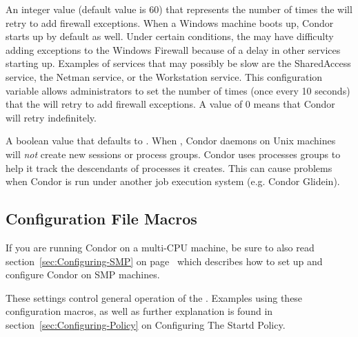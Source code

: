 \begin{description}
\label{param:WindowsFirewallFailureRetry} 
\item[\Macro{WINDOWS\_FIREWALL\_FAILURE\_RETRY}]
  An integer value (default value is 60) that represents
  the number of times the  will retry to add
  firewall exceptions.
  When a Windows machine boots
  up, Condor starts up by default as well. Under certain conditions, the
   may have difficulty adding exceptions to the Windows
  Firewall because of a delay in other services starting up.
  Examples of services that may possibly be slow are the 
  SharedAccess service, the Netman service, or the Workstation service.
  This configuration variable allows administrators to set the number of
  times (once every 10 seconds) that the  will retry
  to add firewall exceptions. A value of 0 means that Condor will
  retry indefinitely.

\label{param:UseProcessGroups} 
\item[\Macro{USE\_PROCESS\_GROUPS}]
  A boolean value that defaults to .  When ,
  Condor daemons on Unix machines will \emph{not} create new sessions
  or process groups. Condor uses processes groups to help it track the
  descendants of processes it creates. This can cause problems when
  Condor is run under another job execution system (e.g. Condor Glidein).

\end{description}

\subsection{\label{sec:Startd-Config-File-Entries}
Configuration File Macros}

\Note If you are running Condor on a multi-CPU machine, be sure
to also read section~\ref{sec:Configuring-SMP} on
page~\pageref{sec:Configuring-SMP} which describes how to set up and
configure Condor on SMP machines.

These settings control general operation of the .
Examples using these configuration macros,
as well as further explanation is found in
section~\ref{sec:Configuring-Policy} on
Configuring The Startd Policy.

